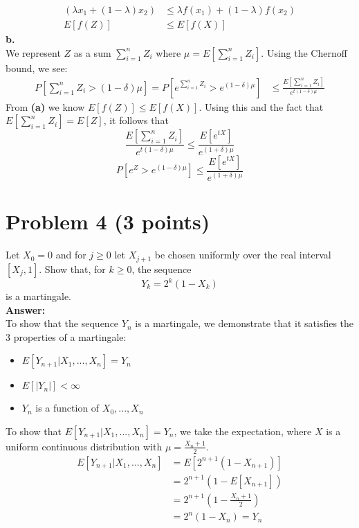 \documentclass[letterpaper, 11pt]{article}
\begin{document}
\begin{align*}
(\lambda x_1 + (1-\lambda)x_2) &\leq \lambda f(x_1) + (1-\lambda)f(x_2) \\
E[f(Z)] &\leq E[f(X)]
\end{align*}
\textbf{b.} \\
We represent $Z$ as a sum $\sum_{i=1}^nZ_i$ where $\mu = E\left[\sum_{i=1}^nZ_i\right]$. Using the Chernoff bound, we see:
\begin{align*}
P \left[\sum_{i=1}^nZ_i > (1-\delta)\mu\right] = P \left[e^{\sum_{i=1}^nZ_i} > e^{(1-\delta)\mu}\right] &\leq \frac{E\left[\sum_{i=1}^nZ_i\right]}{e^{t(1-\delta)\mu}}
\end{align*}
From \textbf{(a)} we know $E[f(Z)] \leq E[f(X)]$. Using this and the fact that $E[\sum_{i=1}^n Z_i]=E[Z]$, it follows that
$$\frac{E\left[\sum_{i=1}^nZ_i\right]}{e^{t(1-\delta)\mu}} \leq \frac{E[e^{tX}]}{e^{(1+\delta)\mu}}$$
$$P \left[e^Z > e^{(1-\delta)\mu}\right] \leq \frac{E[e^{tX}]}{e^{(1+\delta)\mu}}$$

\pagebreak
\section*{Problem 4 (3 points)}
Let $X_0=0$ and for $j \geq 0$ let $X_{j+1}$ be chosen uniformly over the real interval $[X_j,1]$. Show that, for $k \geq 0$, the sequence
$$Y_k=2^k(1-X_k)$$
is a martingale. \\
\textbf{Answer:} \\
To show that the sequence $Y_n$ is a martingale, we demonstrate that it satisfies the 3 properties of a martingale:
\begin{itemize}
\item $E[Y_{n+1} | X_1,...,X_n] = Y_n$
\item $E[|Y_n|] < \infty$
\item $Y_n$ is a function of $X_0,...,X_n$
\end{itemize}

To show that $E[Y_{n+1} | X_1,...,X_n] = Y_n$, we take the expectation, where $X$ is a uniform continuous distribution with $\mu = \frac{X_n+1}{2}$.
\begin{align*}
E[Y_{n+1} | X_1,...,X_n] &= E[2^{n+1}(1-X_{n+1})] \\
&= 2^{n+1}(1-E[X_{n+1}])\\
&= 2^{n+1}(1-\frac{X_n+1}{2}) \\
&= 2^n(1-X_n) = Y_n
\end{align*}
\end{document}
